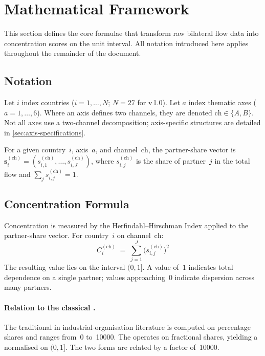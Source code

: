 \section{Mathematical Framework}\label{sec:math-framework}

This section defines the core formulae that transform raw bilateral flow data
into concentration scores on the unit interval.  All notation introduced here
applies throughout the remainder of the document.

\subsection{Notation}\label{sec:math:notation}

Let \(i\) index countries (\(i = 1, \ldots, N\); \(N = 27\) for v\,1.0).
Let \(a\) index thematic axes (\(a = 1, \ldots, 6\)).  Where an axis defines
two channels, they are denoted \(\mathrm{ch} \in \{A, B\}\).  Not all axes
use a two-channel decomposition; axis-specific structures are detailed in
\cref{sec:axis-specifications}.

For a given country~\(i\), axis~\(a\), and channel~\(\mathrm{ch}\), the
partner-share vector is
\(\mathbf{s}_i^{(\mathrm{ch})} = (s_{i,1}^{(\mathrm{ch})}, \ldots,
s_{i,J}^{(\mathrm{ch})})\), where \(s_{i,j}^{(\mathrm{ch})}\) is the share
of partner~\(j\) in the total flow and
\(\sum_{j} s_{i,j}^{(\mathrm{ch})} = 1\).

\subsection{Concentration Formula}\label{sec:math:hhi}

Concentration is measured by the Herfindahl--Hirschman Index applied to the
partner-share vector.  For country~\(i\) on channel~\(\mathrm{ch}\):
%
\begin{equation}\label{eq:hhi}
  C_i^{(\mathrm{ch})}
  \;=\;
  \sum_{j=1}^{J} \bigl(s_{i,j}^{(\mathrm{ch})}\bigr)^{\!2}
\end{equation}
%
The resulting value lies on the interval \((0, 1]\).  A value of~\(1\)
indicates total dependence on a single partner; values approaching~\(0\)
indicate dispersion across many partners.

\paragraph{Relation to the classical \HHI.}
The traditional \HHI in industrial-organisation literature is computed on
percentage shares and ranges from~\(0\) to~\num{10000}.  The \ISI operates
on fractional shares, yielding a normalised \HHI on \((0, 1]\).  The two
forms are related by a factor of~\num{10000}.

